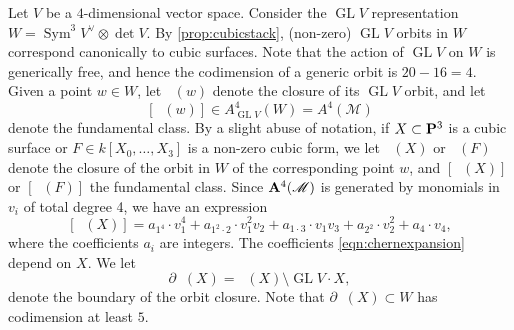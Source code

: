 \documentclass[reqno]{amsart}
\DeclareMathOperator{\Orb}{\overline{Orb}}
\renewcommand {\P}{{\bf P}}
\providecommand {\A}{{\bf A}}
\providecommand{\GL}{\operatorname{GL}}
\providecommand{\Sym}{\operatorname{Sym}}
\numberwithin{equation}{section}
\begin{document}
Let $V$ be a $4$-dimensional vector space.
Consider the $\GL V$ representation $W = \Sym^3 V^{\vee} \otimes \det V$.
By \autoref{prop:cubicstack}, (non-zero) $\GL V$ orbits in $W$ correspond canonically to cubic surfaces.
Note that the action of $\GL V$ on $W$ is generically free, and hence the codimension of a generic orbit is $20-16 = 4$.
Given a point $w \in W$, let $\Orb(w)$ denote the closure of its $\GL V$ orbit, and let
\[ [\Orb(w)] \in A^4_{\GL V}(W) = A^4(\mathscr{M})\]
denote the fundamental class.
By a slight abuse of notation, if $X \subset \P^3$ is a cubic surface or $F \in k[X_0, \dots, X_3]$ is a non-zero cubic form, we let $\Orb(X)$ or $\Orb(F)$ denote the closure of the orbit in $W$ of the corresponding point $w$, and $[\Orb(X)]$ or $[\Orb(F)]$ the fundamental class.
Since $\A^4(\mathscr{M})$ is generated by monomials in $v_i$ of total degree 4, we have an expression
\begin{equation}\label{eqn:chernexpansion}
  [\Orb(X)] = a_{1^4} \cdot v_1^4 + a_{1^2\cdot 2} \cdot v_1^2v_2 + a_{1\cdot 3} \cdot v_1v_3 + a_{2^2} \cdot v_2^2 + a_4 \cdot v_4,
\end{equation}
where the coefficients $a_i$ are integers.
The coefficients \eqref{eqn:chernexpansion} depend on $X$.
We let
\[ \partial \Orb(X) = \Orb(X) \setminus \GL V \cdot X,\]
denote the boundary of the orbit closure.
Note that $\partial \Orb(X) \subset W$ has codimension at least $5$.
\end{document}
